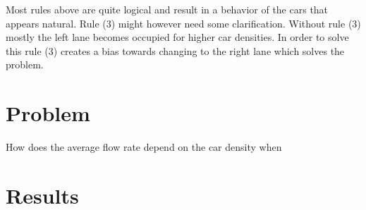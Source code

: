 \documentclass[a4paper,12pt]{article}
\begin{document}
Most rules above are quite logical and result in a behavior of the cars that appears natural. Rule (3) might however need some
clarification. Without rule (3) mostly the left lane becomes occupied for higher car densities. In order to solve this rule (3) creates
a bias towards changing to the right lane which solves the problem.


\section*{Problem}
How does the average flow rate depend on the car density when
\section*{Results}
\end{document}
